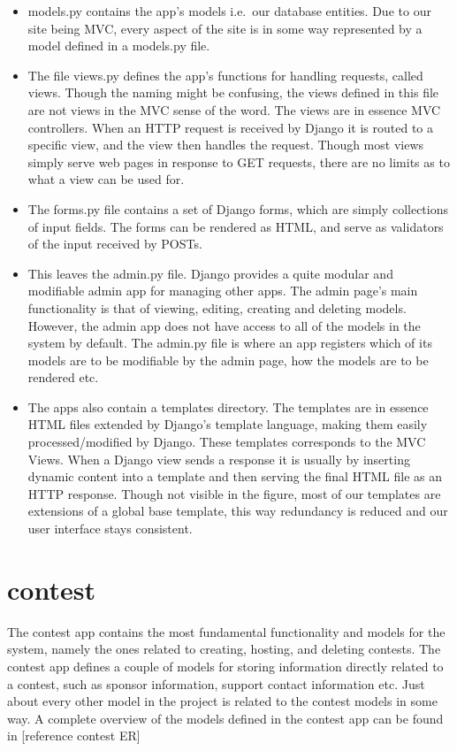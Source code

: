 \begin{itemize}
    \item models.py contains the app's models i.e.\ our database entities. Due
        to our site being MVC, every aspect of the site is in some way
        represented by a model defined in a models.py file.

    \item The file views.py defines the app's functions for
    handling requests, called views. Though the naming might be confusing,
    the views defined in this file are not views in the MVC sense of the
    word. The views are in essence MVC controllers. When an HTTP request is
    received by Django it is routed to a specific view, and the view then
    handles the request. Though most views simply serve web pages in
    response to GET requests, there are no limits as to what a view can be
    used for. 

    \item The forms.py file contains a set of Django forms, which are simply
    collections of input fields. The forms can be rendered as HTML, and
    serve as validators of the input received by POSTs. 

    \item This leaves the admin.py file. Django provides a quite modular and
    modifiable admin app for managing other apps. The admin
    page's main functionality is that of viewing, editing,
    creating and deleting models. However, the admin app does not have
    access to all of the models in the system by default. The admin.py file
    is where an app registers which of its models are to be modifiable by
    the admin page, how the models are to be rendered etc.

    \item The apps also contain a templates directory. The templates are in
    essence HTML files extended by Django's template language, making them
    easily processed/modified by Django. These templates corresponds to the MVC
    Views. When a Django view sends a response it is usually by inserting
    dynamic content into a template and then serving the final HTML file as an
    HTTP response. Though not visible in the figure, most of our templates are
    extensions of a global base template, this way redundancy is reduced and
    our user interface stays consistent.
\end{itemize}

\bigskip

\section{contest}
The contest app contains the most fundamental functionality and models for the system,
namely the ones related to creating, hosting, and deleting contests. 
The contest app defines a couple of models
for storing information directly related to a contest, such as sponsor
information, support contact information etc. Just about every
other model in the project is related to the contest models in some way.
A complete overview of the models defined in the contest app can be
found in [reference contest ER]


